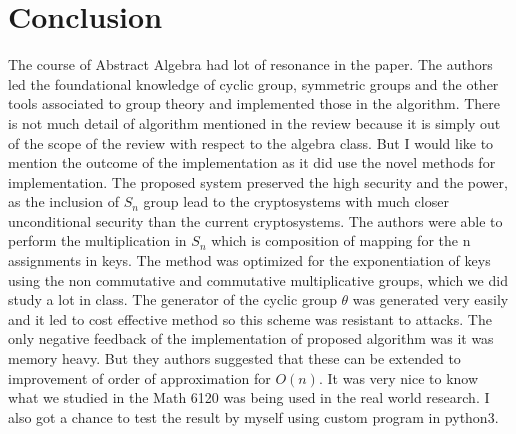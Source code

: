 \documentclass{IEEEtran}
\begin{document}
\section{Conclusion}
The course of Abstract Algebra had lot of resonance in the paper. The authors led the foundational knowledge of cyclic group, symmetric groups and the other tools associated to group theory and implemented those in the algorithm. There is not much detail of algorithm mentioned in the review because it is simply out of the scope of the review with respect to the algebra class. But I would like to mention the outcome of the implementation as it did use the novel methods for implementation. The proposed system preserved the high security and the power, as the inclusion of $S_n$ group lead to the cryptosystems with much closer unconditional security than the current cryptosystems. The authors were able to perform the multiplication in $S_n$ which is composition of mapping for the n assignments in keys. The method was optimized for the exponentiation of keys using the non commutative and commutative multiplicative groups, which we did study a lot in class. The generator of the cyclic group \(\theta\) was generated very easily and it led to cost effective method so this scheme was resistant to attacks. \newline
The only negative feedback of the implementation of proposed algorithm was it was memory heavy. But they authors suggested that these can be extended to improvement of order of approximation for $O(n)$. It was very nice to know what we studied in the Math 6120 was being used in the real world research. I also got a chance to test the result by myself using custom program in python3.


\medskip


\printbibliography
\end{document}
